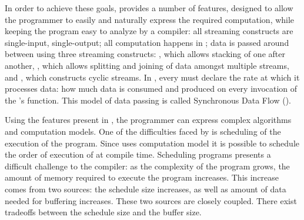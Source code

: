 In order to achieve these goals, {\StreamIt} provides a number of
features, designed to allow the programmer to easily and naturally
express the required computation, while keeping the program easy
to analyze by a compiler: all {\StreamIt} streaming constructs are
single-input, single-output; all computation happens in
{\filters}; data is passed around between {\filters} using three
streaming constructs: {\pipeline}, which allows stacking of
{\filters} one after another, {\splitjoin}, which allows splitting
and joining of data amongst multiple streams, and {\feedbackloop},
which constructs cyclic streams.  In {\StreamIt}, every {\filter}
must declare the rate at which it processes data: how much data is
consumed and produced on every invocation of the {\filter}'s
{\work} function.  This model of data passing is called
Synchronous Data Flow (\SDF).

\begin{comment}
In addition to \SDF, {\StreamIt} allows the programmer to pass
data between {\filters} in an asynchronous manner, similar to a
combination of message passing and function calls. Timing of such
data delivery is expressed in terms of amount of information
wavefronts - the programmer can specify a delay between message
delivery and destination {\filter}'s processing of data currently
being produced or consumed by the source {\filter}.  Such timing
mechanism introduces latency and buffering constraints on
execution of {\StreamIt} programs.
\end{comment}

Using the features present in {\StreamIt}, the programmer can
express complex algorithms and computation models.  One of the
difficulties faced by {\StreamIt} is scheduling of the execution
of the program.  Since {\StreamIt} uses \SDF computation model
it is possible to schedule the order of execution of {\filters} at
compile time.  Scheduling \SDF programs presents a difficult
challenge to the compiler:  as the complexity of the program
grows, the amount of memory required to execute the program
increases.  This increase comes from two sources: the schedule
size increases, as well as amount of data needed for buffering
increases.  These two sources are closely coupled. There exist
tradeoffs between the schedule size and the buffer size.

\begin{comment}
This problem is further complicated by message latency constraints
placed on the program by the programmer.  While {\StreamIt}
programs are meant to provide relatively lax latency requirements,
it is possible to write programs with latency constraints so tight
that very few valid schedules exist. Finding these schedules is a
challenging task.
\end{comment}

